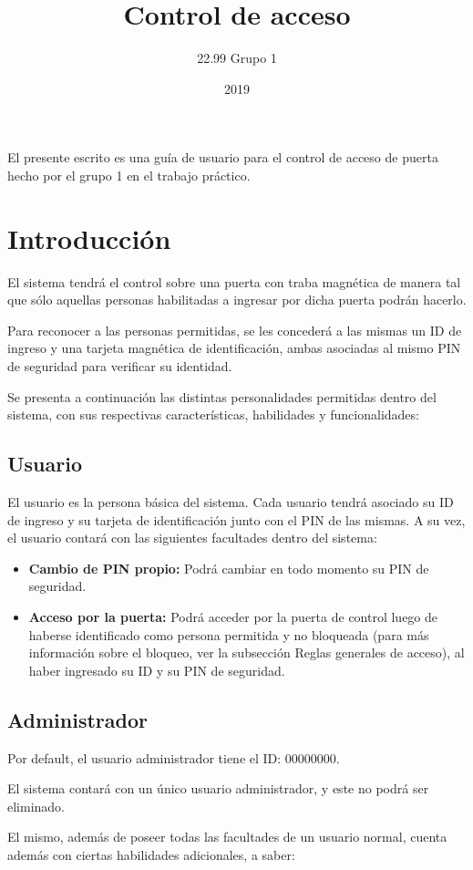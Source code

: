 \documentclass[10pt,a4paper]{article}
\author{22.99 Grupo 1}
\title{Control de acceso}
\date{2019}
\begin{document}
\maketitle
\vspace{20px}
\tableofcontents
\clearpage

El presente escrito es una guía de usuario para el control de acceso de puerta hecho por el grupo 1 en el trabajo práctico.

\section{Introducci\'on}
El sistema tendrá el control sobre una puerta con traba magnética de manera tal que sólo aquellas personas habilitadas a ingresar por dicha puerta podrán hacerlo. \par
Para reconocer a las personas permitidas, se les concederá a las mismas un ID de ingreso y una tarjeta magnética de identificación, ambas asociadas al mismo PIN de seguridad para verificar su identidad. \par
Se presenta a continuación las distintas personalidades permitidas dentro del sistema, con sus respectivas características, habilidades y funcionalidades:\par

\subsection{Usuario}
El usuario es la persona básica del sistema. Cada usuario tendrá asociado su ID de ingreso y su tarjeta de identificación junto con el PIN de las mismas. A su vez, el usuario contará con las siguientes facultades dentro del sistema:
\begin{itemize}
\item \textbf{Cambio de PIN propio: } Podrá cambiar en todo momento su PIN de seguridad.
\item \textbf{Acceso por la puerta: } Podrá acceder por la puerta de control luego de haberse identificado como persona permitida y no bloqueada (para más información sobre el bloqueo, ver la subsección Reglas generales de acceso), al haber ingresado su ID y su PIN de seguridad.
\end{itemize}


\subsection{Administrador}
Por default, el usuario administrador tiene el ID: 00000000. \par
El sistema contará con un único usuario administrador, y este no podrá ser eliminado.\par
El mismo, además de poseer todas las facultades de un usuario normal, cuenta además con ciertas habilidades adicionales, a saber:
\end{document}
